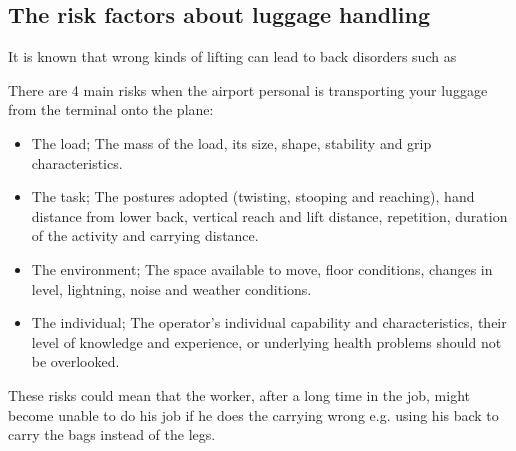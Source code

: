\subsection{The risk factors about luggage handling}

It is known that wrong kinds of lifting can lead to back disorders such as 

There are 4 main risks when the airport personal is transporting your luggage from the terminal onto the plane:

\begin{itemize}
\item The load; The mass of the load, its size, shape, stability and grip characteristics.
\item The task; The postures adopted (twisting, stooping and reaching), hand distance from lower back, vertical reach and lift distance, repetition, duration of the activity and carrying distance.
\item The environment; The space available to move, floor conditions, changes in level, lightning, noise and weather conditions.
\item The individual; The operator's individual capability and characteristics, their level of knowledge and experience, or underlying health problems should not be overlooked.
\end{itemize}

These risks could mean that the worker, after a long time in the job, might become unable to do his job if he does the carrying wrong e.g. using his back to carry the bags instead of the legs.
